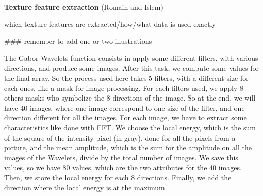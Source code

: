 \textbf{Texture feature extraction} (Romain and Islem)

which texture features are extracted/how/what data is used exactly

### remember to add one or two illustrations 

The Gabor Wavelets function consists in apply some different filters, with various directions, and produce some images. After this task, we compute some values for the final array. So the process used here takes 5 filters, with a different size for each ones, like a mask for image processing. For each filters used, we apply 8 others masks who symbolize the 8 directions of the image. So at the end, we will have 40 images, where one image correspond to one size of the filter, and one direction different for all the images. For each image, we have to extract some characteristics like done with FFT. We choose the local energy, which is the sum of the square of the intensity pixel (in gray), done for all the pixels from a picture, and the mean amplitude, which is the sum for the amplitude on all the images of the Wavelets, divide by the total number of images. We save this values, so we have 80 values, which are the two attributes for the 40 images. Then, we store the local energy for each 8 directions. Finally, we add the direction where the local energy is at the maximum.

    